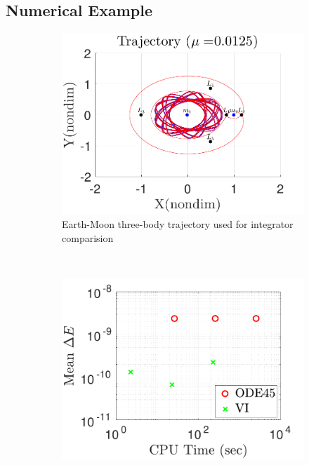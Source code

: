 \documentclass[smallcondensed]{svjour3}
\begin{document}
\subsection{Numerical Example}\label{sec:variational_example}
\begin{figure} 
        \centering 
        \begin{subfigure}[h]{0.5\textwidth} 
                \includegraphics[width=\textwidth]{trajectory} 
                \caption{Earth-Moon three-body trajectory used for integrator comparision} \label{fig:compare_trajectory} 
        \end{subfigure}~ %
        \begin{subfigure}[htbp]{0.5\textwidth} 
                \includegraphics[width=\textwidth]{figures/cputimevsE.pdf} 

\end{subfigure}
\end{figure}
\end{document}
